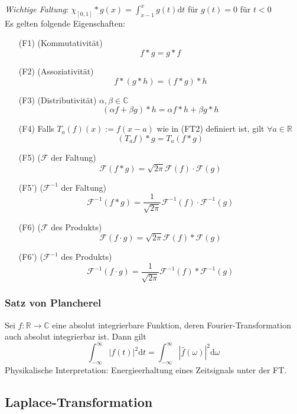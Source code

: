 \documentclass[8pt, a4paper, landscape, fleqn]{scrartcl}
\def\R{\mathbb{R}}
\def\C{\mathbb{C}}
\def\d{\text{d}}
\def\F{\mathcal{F}}
\def\FI{\mathcal{F}^{-1}}
\begin{document}
\begin{multicols*}{3}
		\textit{Wichtige Faltung}: $\chi_{[0,1]}*g(x) = \int_{x-1}^xg(t)\d t$ für $g(t) = 0$ für $t < 0$\\
		
		Es gelten folgende Eigenschaften:
		\begin{itemize}[leftmargin=1cm]
              \item[(F1)] (Kommutativität) $$ f*g = g*f $$
              \item[(F2)] (Assoziativität) $$f*(g*h) = (f*g)*h$$
              \item[(F3)] (Distributivität) $\alpha, \beta \in \C$ $$ (\alpha f + \beta g) * h = \alpha f*h + \beta g*h$$
              \item[(F4)] Falls $T_a(f)(x) := f(x-a)$ wie in (FT2) definiert ist, gilt $\forall a \in \R$ $$ (T_af)*g = T_a(f*g) $$
              \item[(F5)] ($\F$ der Faltung) $$\F(f*g) = \sqrt{2\pi}\F(f)\cdot\F(g) $$
              \item[(F5')] ($\FI$ der Faltung) $$ \FI(f*g) = \frac{1}{\sqrt{2\pi}}\FI(f)\cdot\FI(g) $$
              \item[(F6)] ($\F$ des Produkts) $$ \F(f\cdot g) = \sqrt{2\pi}\F(f)*\F(g) $$
              \item[(F6')] ($\FI$ des Produkts) $$ \FI(f\cdot g) = \frac{1}{\sqrt{2\pi}}\FI(f)*\FI(g) $$
        \end{itemize}
		
		\subsubsection{Satz von Plancherel}
		Sei $f:\R\to\C$ eine absolut integrierbare Funktion, deren Fourier-Transformation auch absolut integrierbar ist. Dann gilt $$ \int_{-\infty}^\infty |f(t)|^2 \d t = \int_{-\infty}^\infty |\hat f (\omega)|^2 \d\omega $$ 
		Physikalische Interpretation: Energieerhaltung eines Zeitsignals unter der FT.

		
		\subsection{Laplace-Transformation}
		

\end{multicols*}
\end{document}
